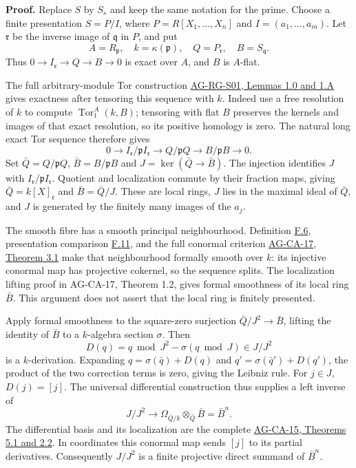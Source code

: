\documentclass[11pt,a4paper,openany]{report}
\begin{document}
\textbf{Proof.} Replace \(S\) by \(S_s\) and keep the same notation for the prime. Choose a finite presentation \(S=P/I\), where \(P=R[X_1,\ldots,X_n]\) and \(I=(a_1,\ldots,a_m)\). Let \(\mathfrak r\) be the inverse image of \(\mathfrak q\) in \(P\), and put \[A=R_{\mathfrak p},\quad k=\kappa(\mathfrak p),\quad
Q=P_{\mathfrak r},\quad B=S_{\mathfrak q}.\] Thus \(0\to I_{\mathfrak r}\to Q\to B\to0\) is exact over \(A\), and \(B\) is \(A\)-flat.

The full arbitrary-module Tor construction \href{https://github.com/KokunoYumeto/open-math-courses/blob/main/docs/courses/AG-RG/AG-RG-S01.md\#1-the-algebra-of-localization}{AG-RG-S01, Lemmas 1.0 and 1.A} gives exactness after tensoring this sequence with \(k\). Indeed use a free resolution of \(k\) to compute \(\operatorname{Tor}_1^A(k,B)\); tensoring with flat \(B\) preserves the kernels and images of that exact resolution, so its positive homology is zero. The natural long exact Tor sequence therefore gives \[0\longrightarrow I_{\mathfrak r}/\mathfrak pI_{\mathfrak r}
\longrightarrow Q/\mathfrak pQ\longrightarrow B/\mathfrak pB\longrightarrow0.\] Set \(\bar Q=Q/\mathfrak pQ\), \(\bar B=B/\mathfrak pB\) and \(J=\ker(\bar Q\to\bar B)\). The injection identifies \(J\) with \(I_{\mathfrak r}/\mathfrak pI_{\mathfrak r}\). Quotient and localization commute by their fraction maps, giving \(\bar Q=k[X]_{\bar{\mathfrak r}}\) and \(\bar B=\bar Q/J\). These are local rings, \(J\) lies in the maximal ideal of \(\bar Q\), and \(J\) is generated by the finitely many images of the \(a_j\).

The smooth fibre has a smooth principal neighbourhood. Definition \hyperref[AG-RG-S05-algebra-definition-smooth]{F.6}, presentation comparison \hyperref[AG-RG-S05-algebra-lemma-NL-homotopy]{F.11}, and the full conormal criterion \href{https://github.com/KokunoYumeto/open-math-courses/blob/d02d0a3669f42579db037cd44de1d113fdd770a1/docs/courses/AG-CA/src/formally-smooth-unramified-and-etale-ring-maps.md}{AG-CA-17, Theorem 3.1} make that neighbourhood formally smooth over \(k\): its injective conormal map has projective cokernel, so the sequence splits. The localization lifting proof in AG-CA-17, Theorem 1.2, gives formal smoothness of its local ring \(\bar B\). This argument does not assert that the local ring is finitely presented.

Apply formal smoothness to the square-zero surjection \(\bar Q/J^2\to\bar B\), lifting the identity of \(\bar B\) to a \(k\)-algebra section \(\sigma\). Then \[D(q)=q\bmod J^2-\sigma(q\bmod J)\in J/J^2\] is a \(k\)-derivation. Expanding \(q=\sigma(\bar q)+D(q)\) and \(q'=\sigma(\bar q')+D(q')\), the product of the two correction terms is zero, giving the Leibniz rule. For \(j\in J\), \(D(j)=[j]\). The universal differential construction thus supplies a left inverse of \[J/J^2\longrightarrow\Omega_{\bar Q/k}\otimes_{\bar Q}\bar B=\bar B^n.\] The differential basis and its localization are the complete \href{https://github.com/KokunoYumeto/open-math-courses/blob/d02d0a3669f42579db037cd44de1d113fdd770a1/docs/courses/AG-CA/src/kahler-differentials.md}{AG-CA-15, Theorems 5.1 and 2.2}. In coordinates this conormal map sends \([j]\) to its partial derivatives. Consequently \(J/J^2\) is a finite projective direct summand of \(\bar B^n\).
\end{document}
